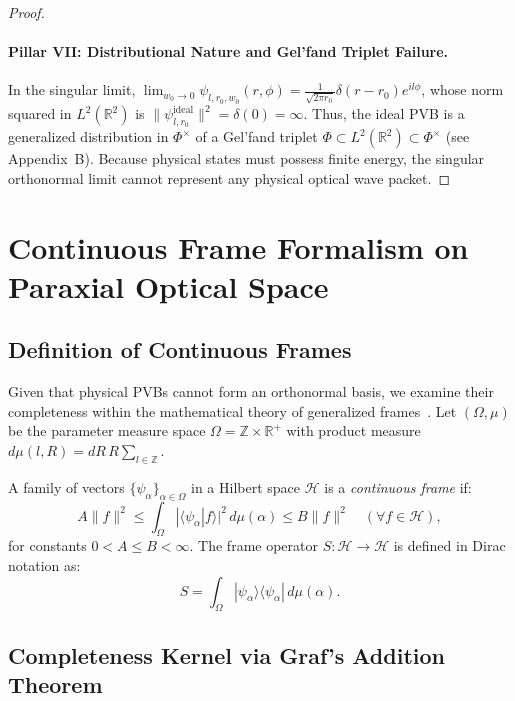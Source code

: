 \documentclass{optica-article}
\begin{document}
\begin{proof}
\paragraph{Pillar VII: Distributional Nature and Gel'fand Triplet Failure.}
In the singular limit, $\lim_{w_0 \to 0} \psi_{l, r_0, w_0}(r, \phi) = \frac{1}{\sqrt{2\pi r_0}} \delta(r - r_0) e^{i l \phi}$, whose norm squared in $L^2(\mathbb{R}^2)$ is $\|\psi_{l, r_0}^{\text{ideal}}\|^2 = \delta(0) = \infty$. Thus, the ideal PVB is a generalized distribution in $\Phi^\times$ of a Gel'fand triplet $\Phi \subset L^2(\mathbb{R}^2) \subset \Phi^\times$ (see Appendix~B). Because physical states must possess finite energy, the singular orthonormal limit cannot represent any physical optical wave packet.
\end{proof}

\section{Continuous Frame Formalism on Paraxial Optical Space}
\label{sec:frame}

\subsection{Definition of Continuous Frames}

Given that physical PVBs cannot form an orthonormal basis, we examine their completeness within the mathematical theory of generalized frames~\cite{Duffin1952,Ali1993,Daubechies1990}. Let $(\Omega, \mu)$ be the parameter measure space $\Omega = \mathbb{Z} \times \mathbb{R}^+$ with product measure $d\mu(l, R) = dR \, R \sum_{l \in \mathbb{Z}}$.

A family of vectors $\{\psi_\alpha\}_{\alpha \in \Omega}$ in a Hilbert space $\mathcal{H}$ is a \emph{continuous frame} if:
\begin{equation}
A \|f\|^2 \le \int_\Omega |\langle \psi_\alpha | f \rangle|^2 \, d\mu(\alpha) \le B \|f\|^2 \quad (\forall f \in \mathcal{H}),
\label{eq:frame_inequality}
\end{equation}
for constants $0 < A \le B < \infty$. The frame operator $S: \mathcal{H} \to \mathcal{H}$ is defined in Dirac notation as:
\begin{equation}
S = \int_\Omega |\psi_\alpha \rangle \langle \psi_\alpha | \, d\mu(\alpha).
\end{equation}

\subsection{Completeness Kernel via Graf's Addition Theorem}
\end{document}
